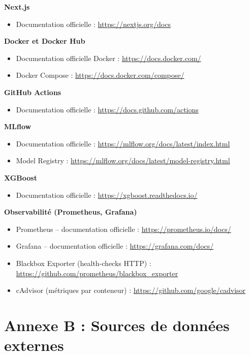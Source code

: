 \documentclass[11pt,a4paper]{report}
\begin{document}
\textbf{Next.js}
\begin{itemize}
  \item Documentation officielle : \url{https://nextjs.org/docs}
\end{itemize}

\textbf{Docker et Docker Hub}
\begin{itemize}
  \item Documentation officielle Docker : \url{https://docs.docker.com/}
  \item Docker Compose : \url{https://docs.docker.com/compose/}
\end{itemize}

\textbf{GitHub Actions}
\begin{itemize}
  \item Documentation officielle : \url{https://docs.github.com/actions}
\end{itemize}

\textbf{MLflow}
\begin{itemize}
  \item Documentation officielle : \url{https://mlflow.org/docs/latest/index.html}
  \item Model Registry : \url{https://mlflow.org/docs/latest/model-registry.html}
\end{itemize}

\textbf{XGBoost}
\begin{itemize}
  \item Documentation officielle : \url{https://xgboost.readthedocs.io/}
\end{itemize}

\textbf{Observabilité (Prometheus, Grafana)}
\begin{itemize}
  \item Prometheus -- documentation officielle : \url{https://prometheus.io/docs/}
  \item Grafana -- documentation officielle : \url{https://grafana.com/docs/}
  \item Blackbox Exporter (health-checks HTTP) : \url{https://github.com/prometheus/blackbox_exporter}
  \item cAdvisor (métriques par conteneur) : \url{https://github.com/google/cadvisor}
\end{itemize}

\section*{Annexe B : Sources de données externes}
\end{document}
